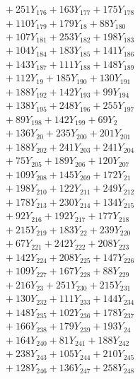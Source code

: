 \documentclass[a4paper,10pt]{article}
\begin{document}
{\begin{align}
&\quad  + 251Y_{176} + 163Y_{177} + 175Y_{178} \\[0.5ex]
&\quad  + 110Y_{179} + 179Y_{18} + 88Y_{180} \\[0.5ex]
&\quad  + 107Y_{181} + 253Y_{182} + 198Y_{183} \\[0.5ex]
&\quad  + 104Y_{184} + 183Y_{185} + 141Y_{186} \\[0.5ex]
&\quad  + 143Y_{187} + 111Y_{188} + 148Y_{189} \\[0.5ex]
&\quad  + 112Y_{19} + 185Y_{190} + 130Y_{191} \\[0.5ex]
&\quad  + 188Y_{192} + 142Y_{193} + 99Y_{194} \\[0.5ex]
&\quad  + 138Y_{195} + 248Y_{196} + 255Y_{197} \\[0.5ex]
&\quad  + 89Y_{198} + 142Y_{199} + 69Y_{2} \\[0.5ex]
&\quad  + 136Y_{20} + 235Y_{200} + 201Y_{201} \\[0.5ex]
&\quad  + 188Y_{202} + 241Y_{203} + 241Y_{204} \\[0.5ex]
&\quad  + 75Y_{205} + 189Y_{206} + 120Y_{207} \\[0.5ex]
&\quad  + 109Y_{208} + 145Y_{209} + 172Y_{21} \\[0.5ex]
&\quad  + 198Y_{210} + 122Y_{211} + 249Y_{212} \\[0.5ex]
&\quad  + 178Y_{213} + 230Y_{214} + 134Y_{215} \\[0.5ex]
&\quad  + 92Y_{216} + 192Y_{217} + 177Y_{218} \\[0.5ex]
&\quad  + 215Y_{219} + 183Y_{22} + 239Y_{220} \\[0.5ex]
&\quad  + 67Y_{221} + 242Y_{222} + 208Y_{223} \\[0.5ex]
&\quad  + 142Y_{224} + 208Y_{225} + 147Y_{226} \\[0.5ex]
&\quad  + 109Y_{227} + 167Y_{228} + 88Y_{229} \\[0.5ex]
&\quad  + 216Y_{23} + 251Y_{230} + 215Y_{231} \\[0.5ex]
&\quad  + 130Y_{232} + 111Y_{233} + 144Y_{234} \\[0.5ex]
&\quad  + 148Y_{235} + 102Y_{236} + 178Y_{237} \\[0.5ex]
&\quad  + 166Y_{238} + 179Y_{239} + 193Y_{24} \\[0.5ex]
&\quad  + 164Y_{240} + 81Y_{241} + 188Y_{242} \\[0.5ex]
&\quad  + 238Y_{243} + 105Y_{244} + 210Y_{245} \\[0.5ex]
&\quad  + 128Y_{246} + 136Y_{247} + 258Y_{248} \\[0.5ex]

\end{align}}
\end{document}
